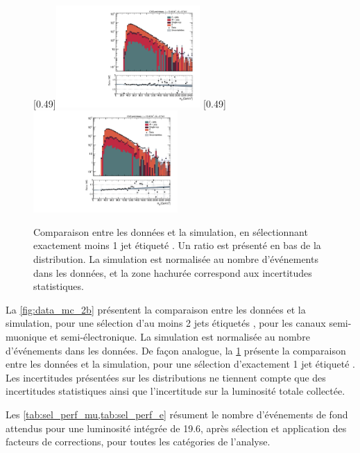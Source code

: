 \begin{figure}[p] \centering
    [0.49\textwidth]{\includegraphics[width=0.49\textwidth,angle=-90,origin=c]{chapitre7/figs/data_mc/1btag/semimu/hmttSelected_btag_sel.pdf}} \hfill
    [0.49\textwidth]{\includegraphics[width=0.49\textwidth,angle=-90,origin=c]{chapitre7/figs/data_mc/1btag/semie/hmttSelected_btag_sel.pdf}}
    \caption{Comparaison entre les données et la simulation, en sélectionnant exactement moins 1 jet étiqueté \Pbottom{}. Un ratio est présenté en bas de la distribution. La simulation est normalisée au nombre d'événements dans les données, et la zone hachurée correspond aux incertitudes statistiques.}
    \label{fig:data_mc_1b}
\end{figure}

La \cref{fig:data_mc_2b} présentent la comparaison entre les données et la simulation, pour une sélection d'au moins 2 jets étiquetés \Pbottom, pour les canaux semi-muonique et semi-électronique. La simulation est normalisée au nombre d'événements dans les données. De façon analogue, la \cref{fig:data_mc_1b} présente la comparaison entre les données et la simulation, pour une sélection d'exactement 1 jet étiqueté \Pbottom. Les incertitudes présentées sur les distributions ne tiennent compte que des incertitudes statistiques ainsi que l'incertitude sur la luminosité totale collectée.

\medskip

Les \cref{tab:sel_perf_mu,tab:sel_perf_e} résument le nombre d'événements de fond attendus pour une luminosité intégrée de \SI{19.6}{\invfb}, après sélection et application des facteurs de corrections, pour toutes les catégories de l'analyse.

